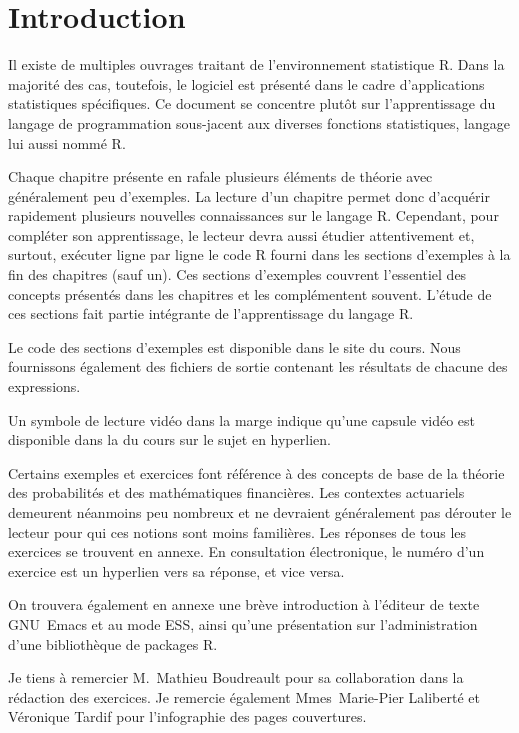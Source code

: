 \chapter*{Introduction}

Il existe de multiples ouvrages traitant de l'environnement
statistique R. Dans la majorité des cas, toutefois, le logiciel est
présenté dans le cadre d'applications statistiques spécifiques. Ce
document se concentre plutôt sur l'apprentissage du langage de
programmation sous-jacent aux diverses fonctions statistiques, langage
lui aussi nommé R.

Chaque chapitre présente en rafale plusieurs éléments de théorie avec
généralement peu d'exemples. La lecture d'un chapitre permet donc
d'acquérir rapidement plusieurs nouvelles connaissances sur le langage
R. Cependant, pour compléter son apprentissage, le lecteur devra aussi
étudier attentivement et, surtout, exécuter ligne par ligne le code R
fourni dans les sections d'exemples à la fin des chapitres (sauf un).
Ces sections d'exemples couvrent l'essentiel des concepts présentés
dans les chapitres et les complémentent souvent. L'étude de ces
sections fait partie intégrante de l'apprentissage du langage R.

Le code des sections d'exemples est disponible dans le site du cours.
Nous fournissons également des fichiers de sortie contenant les
résultats de chacune des expressions.

Un symbole de lecture vidéo dans la marge indique qu'une capsule vidéo
est disponible dans la %
du cours sur le sujet en hyperlien.

Certains exemples et exercices font référence à des concepts de base
de la théorie des probabilités et des mathématiques financières. Les
contextes actuariels demeurent néanmoins peu nombreux et ne devraient
généralement pas dérouter le lecteur pour qui ces notions sont moins
familières. Les réponses de tous les exercices se trouvent en annexe.
En consultation électronique, le numéro d'un exercice est un hyperlien
vers sa réponse, et vice versa.

On trouvera également en annexe une brève introduction à l'éditeur de
texte GNU~Emacs et au mode ESS, ainsi qu'une présentation sur
l'administration d'une bibliothèque de packages R.

Je tiens à remercier M.~Mathieu Boudreault pour sa collaboration dans
la rédaction des exercices. Je remercie également Mmes~Marie-Pier
Laliberté et Véronique Tardif pour l'infographie des pages
couvertures.

